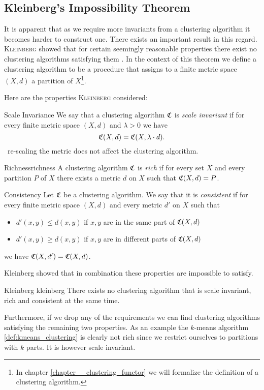 \subsection{Kleinberg's Impossibility Theorem}
It is apparent that as we require more invariants from a clustering algorithm it becomes harder to construct one.
There exists an important result in this regard.
\textsc{Kleinberg} showed that for certain seemingly reasonable properties there exist no clustering algorithms satisfying them \cite{Kleinberg2002}.
In the context of this theorem we define a clustering algorithm to be a procedure that assigns to a finite metric space $(X,d)$ a partition of $X$\footnote{In chapter \ref{chapter__clustering_functor} we will formalize the definition of a clustering algorithm.}.

Here are the properties \textsc{Kleinberg} considered:

\begin{definition}{Scale Invariance}{}
We say that a clustering algorithm $\mathfrak{C}$ is \emph{scale invariant} if for every finite metric space $(X,d)$ and $\lambda > 0$ we have
$$
\mathfrak{C}(X,d) = \mathfrak{C}(X, \lambda \cdot d).
$$
\Ie\ re-scaling the metric does not affect the clustering algorithm.
\end{definition}

\begin{definition}{Richness}{richness}
A clustering algorithm $\mathfrak{C}$ is \emph{rich} if for every set $X$ and every partition $P$ of $X$ there exists a metric $d$ on $X$ such that $\mathfrak{C}(X,d) = P$.
\end{definition}

\begin{definition}{Consistency}{}
Let $\mathfrak{C}$ be a clustering algorithm. We say that it is \emph{consistent} if for every finite metric space $(X,d)$ and every metric $d'$ on $X$ such that
\begin{itemize}
    \item $d'(x,y) \leq d(x,y)$ if $x,y$ are in the same part of $\mathfrak{C}(X,d)$
    \item $d'(x,y) \geq d(x,y)$ if $x,y$ are in different parts of $\mathfrak{C}(X,d)$
\end{itemize}
we have $\mathfrak{C}(X,d') = \mathfrak{C}(X,d)$.
\end{definition}

Kleinberg showed that in combination these properties are impossible to satisfy.

\begin{theorem}{Kleinberg \cite[Thm.~2.1]{Kleinberg2002}}{kleinberg}
There exists no clustering algorithm that is scale invariant, rich and consistent at the same time.
\end{theorem}

Furthermore, if we drop any of the requirements we can find clustering algorithms satisfying the remaining two properties. As an example the $k$-means algorithm \ref{def:kmeans_clustering} is clearly not rich since we restrict ourselves to partitions with $k$ parts. It is however scale invariant.

